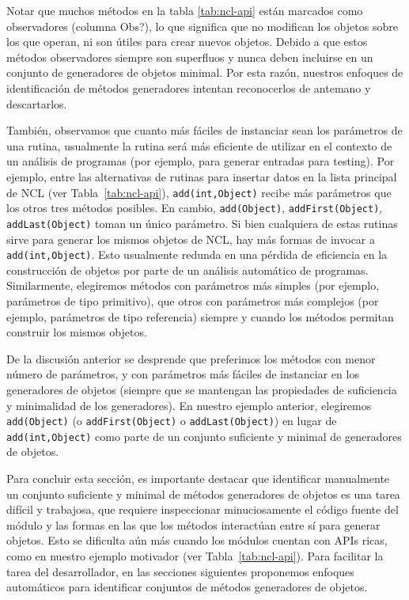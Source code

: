 Notar que muchos métodos en la tabla \ref{tab:ncl-api} están marcados como observadores (columna Obs?), lo que significa que no modifican los objetos sobre los que operan, ni son útiles para crear nuevos objetos. 
Debido a que estos métodos observadores siempre son superfluos y nunca deben incluirse en un conjunto de generadores de objetos minimal. Por esta razón, nuestros enfoques de identificación de métodos generadores intentan reconocerlos de antemano y descartarlos.

También, observamos que cuanto más fáciles de instanciar sean los parámetros de una rutina, usualmente la rutina será más eficiente de utilizar en el contexto de un análisis de programas (por ejemplo, para generar entradas para testing). Por ejemplo, entre las alternativas de rutinas para insertar datos en
la lista principal de NCL (ver Tabla~\ref{tab:ncl-api}), \texttt{add(int,Object)} recibe más parámetros que los otros tres métodos posibles. En cambio, \texttt{add(Object)}, \texttt{addFirst(Object)}, \texttt{addLast(Object)} toman un único parámetro. Si bien cualquiera de estas rutinas sirve para generar los mismos objetos de NCL, hay más formas de invocar a \texttt{add(int,Object)}. Esto usualmente redunda en una pérdida de eficiencia en la construcción de objetos por parte de un análisis automático de programas. Similarmente, elegiremos métodos con parámetros más simples (por ejemplo, parámetros de tipo primitivo), que otros con parámetros más complejos (por ejemplo, parámetros de tipo referencia) siempre y cuando los métodos permitan construir los mismos objetos.

De la discusión anterior se desprende que preferimos los métodos con menor número de parámetros, y con parámetros más fáciles de instanciar en los generadores de objetos (siempre que se mantengan las propiedades de suficiencia y minimalidad de los generadores). 
En nuestro ejemplo anterior, elegiremos \texttt{add(Object)} (o \texttt{addFirst(Object)} o \texttt{addLast(Object)}) en lugar de \\
\texttt{add(int,Object)} 
como parte de un conjunto suficiente y minimal de generadores de objetos.

Para concluir esta sección, es importante destacar que identificar manualmente un conjunto suficiente y minimal de métodos generadores de objetos es una tarea difícil y trabajosa, que requiere inspeccionar minuciosamente el código fuente del módulo y las formas en las que los métodos interactúan entre sí para generar objetos. Esto se dificulta aún más cuando los módulos cuentan con APIs ricas, como en nuestro ejemplo motivador (ver Tabla~\ref{tab:ncl-api}). 
Para facilitar la tarea del desarrollador, en las secciones siguientes proponemos enfoques automáticos para identificar conjuntos de métodos generadores de objetos.

